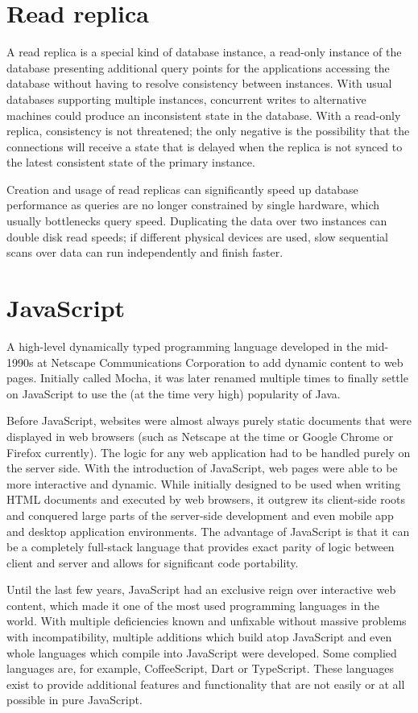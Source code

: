 \section{Read replica}
A read replica is a special kind of database instance, a read-only instance of
the database presenting additional query points for the applications accessing
the database without having to resolve consistency between instances. With usual
databases supporting multiple instances, concurrent writes to alternative
machines could produce an inconsistent state in the database. With a read-only
replica, consistency is not threatened; the only negative is the possibility
that the connections will receive a state that is delayed when the replica is
not synced to the latest consistent state of the primary instance.

Creation and usage of read replicas can significantly speed up database
performance as queries are no longer constrained by single hardware, which
usually bottlenecks query speed. Duplicating the data over two instances can
double disk read speeds; if different physical devices are used, slow sequential
scans over data can run independently and finish faster.


\section{JavaScript}
A high-level dynamically typed programming language developed in the mid-1990s
at Netscape Communications Corporation to add dynamic content to web pages.
Initially called Mocha, it was later renamed multiple times to finally settle on
JavaScript to use the (at the time very high) popularity of Java.

Before JavaScript, websites were almost always purely static documents that were
displayed in web browsers (such as Netscape at the time or Google Chrome or
Firefox currently). The logic for any web application had to be handled purely
on the server side. With the introduction of JavaScript, web pages were able to
be more interactive and dynamic. While initially designed to be used when
writing HTML documents and executed by web browsers, it outgrew its client-side
roots and conquered large parts of the server-side development and even mobile
app and desktop application environments. The advantage of JavaScript is that it
can be a completely full-stack language that provides exact parity of logic
between client and server and allows for significant code portability.

Until the last few years, JavaScript had an exclusive reign over interactive web
content, which made it one of the most used programming languages in the world.
With multiple deficiencies known and unfixable without massive problems with
incompatibility, multiple additions which build atop JavaScript and even whole
languages which compile into JavaScript were developed. Some complied languages
are, for example, CoffeeScript, Dart or TypeScript. These languages exist to
provide additional features and functionality that are not easily or at all
possible in pure JavaScript.


